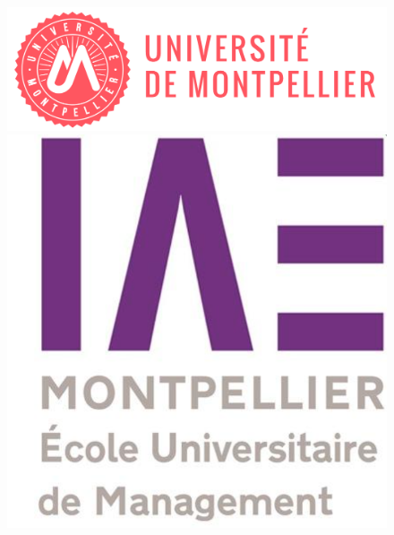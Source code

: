 \documentclass[french,12pt]{report}
\newcommand{\<}{\langle}
\renewcommand{\>}{\rangle}
\theoremstyle{definition}
\begin{document}
\begin{titlepage}

\begin{figure}
     \begin{minipage}{0.4\textwidth}
         \begin{flushleft}
             \includegraphics[scale=0.7]{univ.png}
             
         \end{flushleft}
     \end{minipage}
     \hfill
     \begin{minipage}{0.4\textwidth}
         \begin{flushright}
             \includegraphics[scale=0.3]{IAE.png}
          
         \end{flushright}
     \end{minipage}
\end{figure}



\end{titlepage}
\end{document}

